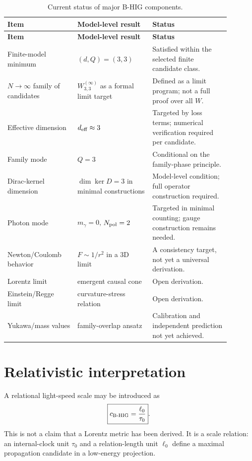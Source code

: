 \documentclass[11pt,a4paper]{article}
\begin{document}
\begin{longtable}{p{0.28\linewidth}p{0.30\linewidth}p{0.31\linewidth}}
\caption{Current status of major B-HIG components.}\label{tab:status}\\
\toprule
\textbf{Item} & \textbf{Model-level result} & \textbf{Status}\\
\midrule
\endfirsthead
\toprule
\textbf{Item} & \textbf{Model-level result} & \textbf{Status}\\
\midrule
\endhead
Finite-model minimum & $(d,Q)=(3,3)$ & Satisfied within the selected finite candidate class.\\
$N\to\infty$ family of candidates & $W^{(\infty)}_{3,3}$ as a formal limit target & Defined as a limit program; not a full proof over all $W$.\\
Effective dimension & $d_{\rm eff}\approx 3$ & Targeted by loss terms; numerical verification required per candidate.\\
Family mode & $Q=3$ & Conditional on the family-phase principle.\\
Dirac-kernel dimension & $\dim\ker D=3$ in minimal constructions & Model-level condition; full operator construction required.\\
Photon mode & $m_\gamma=0$, $N_{\rm pol}=2$ & Targeted in minimal counting; gauge construction remains needed.\\
Newton/Coulomb behavior & $F\sim 1/r^2$ in a 3D limit & A consistency target, not yet a universal derivation.\\
Lorentz limit & emergent causal cone & Open derivation.\\
Einstein/Regge limit & curvature-stress relation & Open derivation.\\
Yukawa/mass values & family-overlap ansatz & Calibration and independent prediction not yet achieved.\\
\bottomrule
\end{longtable}

\section{Relativistic interpretation}
A relational light-speed scale may be introduced as
\begin{equation}
\boxed{c_{\rm B\text{-}HIG}=\frac{\ell_0}{\tau_0}} .
\label{eq:c_scale}
\end{equation}
This is not a claim that a Lorentz metric has been derived. It is a scale relation: an internal-clock unit $\tau_0$ and a relation-length unit $\ell_0$ define a maximal propagation candidate in a low-energy projection.
\end{document}
